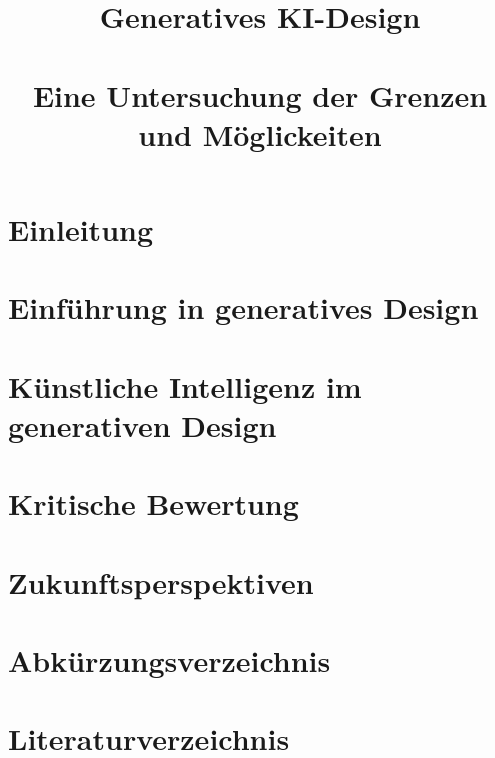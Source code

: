 \documentclass[conference]{IEEEtran}
\begin{document}

\title{Generatives KI-Design\\
\large \ \\ \large Eine Untersuchung der Grenzen und Möglickeiten}

\author{

  \and

}

\maketitle



\section{Einleitung}


\section{Einführung in generatives Design}


\section{Künstliche Intelligenz im generativen Design}


\section{Kritische Bewertung}


\section{Zukunftsperspektiven}


\listoffigures
{}

\section*{Abkürzungsverzeichnis}


\section*{Literaturverzeichnis}
\printbibliography[heading=none]{}
\end{document}
